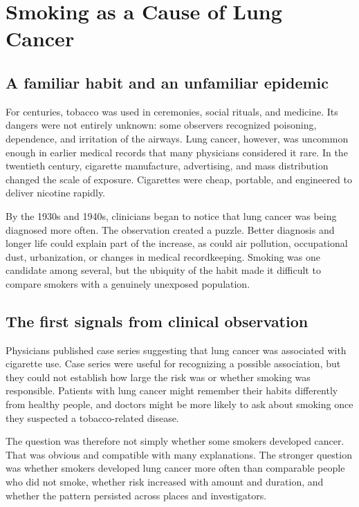 \documentclass[12pt,oneside]{book}
\begin{document}
\chapter[Smoking as a Cause of Lung Cancer]{Smoking as a Cause of Lung Cancer}

\section{A familiar habit and an unfamiliar epidemic}
For centuries, tobacco was used in ceremonies, social rituals, and medicine.
Its dangers were not entirely unknown: some observers recognized poisoning,
dependence, and irritation of the airways. Lung cancer, however, was uncommon
enough in earlier medical records that many physicians considered it rare. In
the twentieth century, cigarette manufacture, advertising, and mass
distribution changed the scale of exposure. Cigarettes were cheap, portable,
and engineered to deliver nicotine rapidly.

By the 1930s and 1940s, clinicians began to notice that lung cancer was being
diagnosed more often. The observation created a puzzle. Better diagnosis and
longer life could explain part of the increase, as could air pollution,
occupational dust, urbanization, or changes in medical recordkeeping. Smoking
was one candidate among several, but the ubiquity of the habit made it
difficult to compare smokers with a genuinely unexposed population.

\section{The first signals from clinical observation}
Physicians published case series suggesting that lung cancer was associated with
cigarette use. Case series were useful for recognizing a possible association,
but they could not establish how large the risk was or whether smoking was
responsible. Patients with lung cancer might remember their habits differently
from healthy people, and doctors might be more likely to ask about smoking once
they suspected a tobacco-related disease.

The question was therefore not simply whether some smokers developed cancer.
That was obvious and compatible with many explanations. The stronger question
was whether smokers developed lung cancer more often than comparable people who
did not smoke, whether risk increased with amount and duration, and whether the
pattern persisted across places and investigators.
\end{document}
